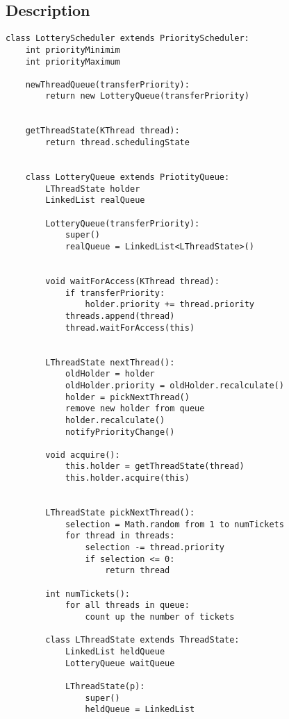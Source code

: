 \documentclass{article}
\begin{document}
\subsection{Description}
\begin{verbatim}
class LotteryScheduler extends PriorityScheduler:
    int priorityMinimim
    int priorityMaximum
    
    newThreadQueue(transferPriority):
        return new LotteryQueue(transferPriority)
    
    
    getThreadState(KThread thread):
        return thread.schedulingState
    
    
    class LotteryQueue extends PriotityQueue:
        LThreadState holder
        LinkedList realQueue
        
        LotteryQueue(transferPriority):
            super()
            realQueue = LinkedList<LThreadState>()
        
        
        void waitForAccess(KThread thread):
            if transferPriority:
                holder.priority += thread.priority          
            threads.append(thread)                              
            thread.waitForAccess(this)                          
            
        
        LThreadState nextThread():
            oldHolder = holder                      
            oldHolder.priority = oldHolder.recalculate()
            holder = pickNextThread()
            remove new holder from queue
            holder.recalculate()
            notifyPriorityChange()
        
        void acquire():
            this.holder = getThreadState(thread)                
            this.holder.acquire(this)                           

        
        LThreadState pickNextThread():
            selection = Math.random from 1 to numTickets        
            for thread in threads:                               
                selection -= thread.priority                    
                if selection <= 0:                              
                    return thread           
        
        int numTickets():
            for all threads in queue:
                count up the number of tickets 
                    
        class LThreadState extends ThreadState:
            LinkedList heldQueue
            LotteryQueue waitQueue
            
            LThreadState(p):
                super()
                heldQueue = LinkedList
                

\end{verbatim}
\end{document}
